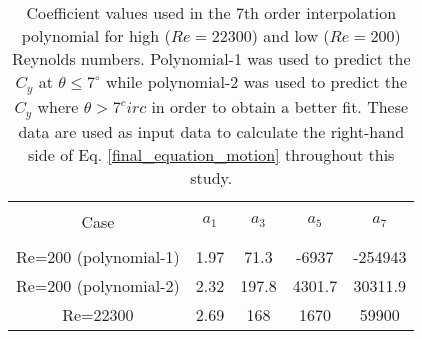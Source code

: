 \begin{table}[ht]

\begin{center}
\setlength{\unitlength}{\textwidth}

\begin{tabular}{c c c c c} %
\hline\hline %
\\[0.2ex]
Case & $a_1$ & $a_3$ & $a_5$ & $a_7$ \\ [0.8ex] %
\hline 
\\[0.8ex]%
Re=200 (polynomial-1) & 1.97 & 71.3  &-6937 &-254943  \\[0.8ex]
Re=200 (polynomial-2)& 2.32 & 197.8 & 4301.7 & 30311.9 \\[0.8ex]%
Re=22300 & 2.69 & 168 & 1670 & 59900 \\ [1ex] %
\hline %
\end{tabular}

\caption{Coefficient values used in the 7th order interpolation polynomial for high ($Re=22300$) and low ($Re=200$) Reynolds numbers. Polynomial-1 was used to predict the $C_y$ at $\theta \leq 7^\circ$ while polynomial-2 was used to predict the $C_y$ where $\theta>7^circ$ in order to obtain a better fit. These data are used as input data to calculate the right-hand side of Eq. \ref{final_equation_motion} throughout this study.}
 
\label{table:cy-coefficients} %
\end{center}
\end{table}

